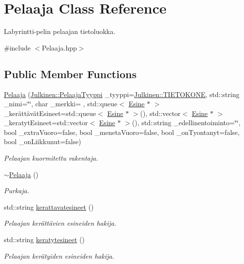 \hypertarget{class_pelaaja}{}\section{Pelaaja Class Reference}
\label{class_pelaaja}


Labyrintti-\/pelin pelaajan tietoluokka.  




{\ttfamily \#include $<$Pelaaja.\+hpp$>$}

\subsection*{Public Member Functions}
\begin{DoxyCompactItemize}
\item 
\hyperlink{class_pelaaja_a278f63f50df4d765e6f0d9f7f69cb369}{Pelaaja} (\hyperlink{namespace_julkinen_ad9a0a9e01af78249f584a93b03db4329}{Julkinen\+::\+Pelaaja\+Tyyppi} \+\_\+tyyppi=\hyperlink{namespace_julkinen_ad9a0a9e01af78249f584a93b03db4329a72363d3abdcf0ff5a5318785a7d18363}{Julkinen\+::\+T\+I\+E\+T\+O\+K\+O\+N\+E}, std\+::string \+\_\+nimi=\char`\"{}\char`\"{}, char \+\_\+merkki= \textquotesingle{} \textquotesingle{}, std\+::queue$<$ \hyperlink{class_esine}{Esine} $\ast$ $>$ \+\_\+kerättävät\+Esineet=std\+::queue$<$ \hyperlink{class_esine}{Esine} $\ast$ $>$(), std\+::vector$<$ \hyperlink{class_esine}{Esine} $\ast$ $>$ \+\_\+keratyt\+Esineet=std\+::vector$<$ \hyperlink{class_esine}{Esine} $\ast$ $>$(), std\+::string \+\_\+edellinentoiminto=\char`\"{}\char`\"{}, bool \+\_\+extra\+Vuoro=false, bool \+\_\+meneta\+Vuoro=false, bool \+\_\+on\+Tyontanyt=false, bool \+\_\+on\+Liikkunut=false)
\begin{DoxyCompactList}\small\item\em Pelaajan kuormitettu rakentaja. \end{DoxyCompactList}\item 
\hyperlink{class_pelaaja_a60fe9baaf937de8fab8289f6bfc5e1ca}{$\sim$\+Pelaaja} ()
\begin{DoxyCompactList}\small\item\em Purkaja. \end{DoxyCompactList}\item 
std\+::string \hyperlink{class_pelaaja_af6d71411c2fb113bc8ae3c7ae0a7c2c7}{kerattavatesineet} ()
\begin{DoxyCompactList}\small\item\em Pelaajan kerättävien esineiden hakija. \end{DoxyCompactList}\item 
std\+::string \hyperlink{class_pelaaja_a65501bf1a3bb406261fcde36d1810c63}{keratytesineet} ()
\begin{DoxyCompactList}\small\item\em Pelaajan kerätyiden esineiden hakija. \end{DoxyCompactList}\end{DoxyCompactItemize}
